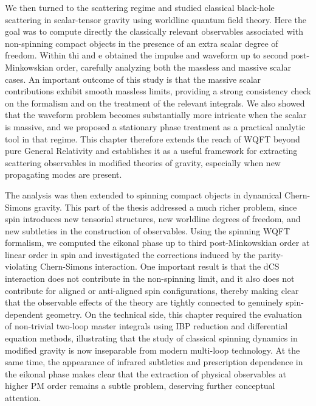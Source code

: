 \documentclass[11pt,a4paper,oneside]{book}
\begin{document}
We then turned to the scattering regime and studied classical black-hole scattering in scalar-tensor gravity using worldline quantum field theory. Here the goal was to compute directly the classically relevant observables associated with non-spinning compact objects in the presence of an extra scalar degree of freedom. Within thi and e obtained the impulse and waveform up to second post-Minkowskian order, carefully analyzing both the massless and massive scalar cases. An important outcome of this study is that the massive scalar contributions exhibit smooth massless limits, providing a strong consistency check on the formalism and on the treatment of the relevant integrals. We also showed that the waveform problem becomes substantially more intricate when the scalar is massive, and we proposed a stationary phase treatment as a practical analytic tool in that regime. This chapter therefore extends the reach of WQFT beyond pure General Relativity and establishes it as a useful framework for extracting scattering observables in modified theories of gravity, especially when new propagating modes are present.

The analysis was then extended to spinning compact objects in dynamical Chern-Simons gravity. This part of the thesis addressed a much richer problem, since spin introduces new tensorial structures, new worldline degrees of freedom, and new subtleties in the construction of observables. Using the spinning WQFT formalism, we computed the eikonal phase up to third post-Minkowskian order at linear order in spin and investigated the corrections induced by the parity-violating Chern-Simons interaction. One important result is that the dCS interaction does not contribute in the non-spinning limit, and it also does not contribute for aligned or anti-aligned spin configurations, thereby making clear that the observable effects of the theory are tightly connected to genuinely spin-dependent geometry. On the technical side, this chapter required the evaluation of non-trivial two-loop master integrals using IBP reduction and differential equation methods, illustrating that the study of classical spinning dynamics in modified gravity is now inseparable from modern multi-loop technology. At the same time, the appearance of infrared subtleties and prescription dependence in the eikonal phase makes clear that the extraction of physical observables at higher PM order remains a subtle problem, deserving further conceptual attention.
\end{document}
